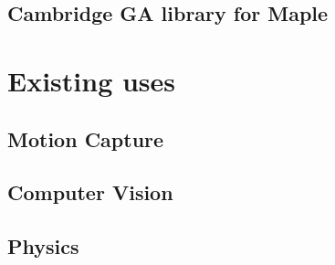 \subsection{Cambridge GA library for Maple}

\section{Existing uses}

\subsection{Motion Capture}
\subsection{Computer Vision}
\subsection{Physics}

